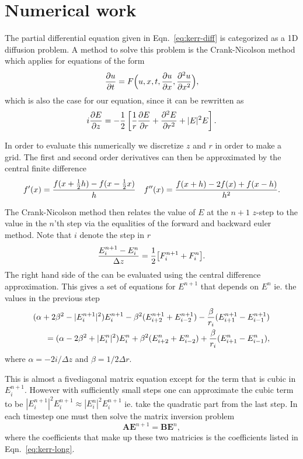\section{Numerical work}

The partial differential equation given in Eqn.~\eqref{eq:kerr-diff} is categorized as a 1D
diffusion problem. A method to solve this problem is the Crank-Nicolson method which applies for
equations of the form
\begin{equation}
  \label{eq:Crank-Nicolson}
  \frac{\partial u}{\partial t} = F \Big(u, x, t, \frac{\partial u}{\partial x}, \frac{\partial^2 u}{\partial x^2} \Big), 
\end{equation}
which is also the case for our equation, since it can be rewritten as
\begin{equation}
  \label{eq:kerr-diff-crank}
  i\frac{\partial E}{\partial z} = -\frac{1}{2} \left[\frac{1}{r} \frac{\partial E}{\partial r} + \frac{\partial^2 E}{\partial r^2} + |E|^{2} E \right]. 
\end{equation}

In order to evaluate this numerically we discretize $z$ and $r$ in order to make a grid. The first
and second order derivatives can then be approximated by the central finite difference
\begin{equation}
  \label{eq:central-diff}
  f'(x) = \frac{f(x+\frac{1}{2} h) - f(x - \frac{1}{2} x)}{h} \quad f''(x) = \frac{f(x+h) - 2f(x) + f(x-h)}{h^{2}}.
\end{equation}

The Crank-Nicolson method then relates the value of $E$ at the $n+1$ $z$-step to the value in the
$n$'th step via the equalities of the forward and backward euler method. Note that $i$ denote the
step in $r$
\begin{equation}
  \label{eq:Crank-Nicolson-discrete}
  \frac{E^{n+1}_{i} - E^{n}_{i}}{\Delta z} = \frac{1}{2} \big[F_{i}^{n+1}+F_{i}^{n} \big].
\end{equation}
The right hand side of the can be evaluated using the central difference approximation. This gives
a set of equations for $E^{n+1}$ that depends on $E^{n}$ ie. the values in the previous step
\begin{align}
  \notag
  (\alpha + 2\beta^{2} - |E_{i}^{n+1}|^{2})E_{i}^{n+1} - \beta^{2}(E_{i+2}^{n+1} + E_{i-2}^{n+1}) -
  \frac{\beta}{r_{i}} (E_{i+1}^{n+1} - E_{i-1}^{n+1}) \\
  = (\alpha - 2\beta^{2} + |E_{i}^{n}|^{2})E_{i}^{n} + \beta^{2}(E_{i+2}^{n} + E_{i-2}^{n}) +
  \frac{\beta}{r_{i}} (E_{i+1}^{n} - E_{i-1}^{n}), 
  \label{eq:kerr-long}
\end{align}
where $\alpha = -2i/\!{\Delta z}$ and $\beta = 1/{2 \Delta r}$.

This is almost a fivediagonal matrix equation except for the term that is cubic in
$E_{i}^{n+1}$. However with sufficiently small steps one can approximate the cubic term to be
$|E_{i}^{n+1}|^{2}E_{i}^{n+1} \approx |E_{i}^{n}|^{2}E_{i}^{n+1}$ ie. take the quadratic part from
the last step. In each timestep one must then solve the matrix inversion problem
\begin{equation}
  \label{eq:matrix}
  \mathbf{A} \mathbf{E}^{n+1} = \mathbf{B} \mathbf{E}^{n}, 
\end{equation}
where the coefficients that make up these two matricies is the coefficients listed in
Eqn.~\eqref{eq:kerr-long}. 


